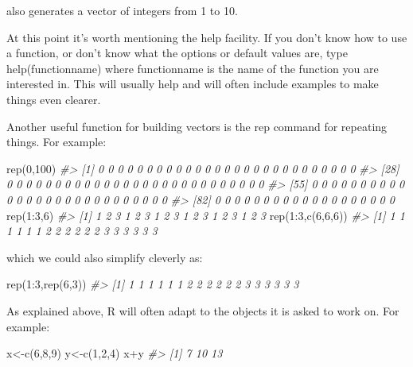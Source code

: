\documentclass[
]{book}
\newenvironment{Shaded}{\begin{snugshade}}{\end{snugshade}}
\newcommand{\CommentTok}[1]{\textcolor[rgb]{0.56,0.35,0.01}{\textit{#1}}}
\newcommand{\DecValTok}[1]{\textcolor[rgb]{0.00,0.00,0.81}{#1}}
\newcommand{\FunctionTok}[1]{\textcolor[rgb]{0.00,0.00,0.00}{#1}}
\newcommand{\NormalTok}[1]{#1}
\newcommand{\OtherTok}[1]{\textcolor[rgb]{0.56,0.35,0.01}{#1}}
\newcommand{\SpecialCharTok}[1]{\textcolor[rgb]{0.00,0.00,0.00}{#1}}
\begin{document}
also generates a vector of integers from 1 to 10.

At this point it's worth mentioning the help facility. If you don't know how to use a function,
or don't know what the options or default values are, type help(functionname) where functionname is the name of the function you are interested in. This will usually help and will often include examples to make things even clearer.

Another useful function for building vectors is the rep command for repeating things. For
example:

\begin{Shaded}
\begin{Highlighting}[]
\FunctionTok{rep}\NormalTok{(}\DecValTok{0}\NormalTok{,}\DecValTok{100}\NormalTok{)}
\CommentTok{\#\textgreater{}   [1] 0 0 0 0 0 0 0 0 0 0 0 0 0 0 0 0 0 0 0 0 0 0 0 0 0 0 0}
\CommentTok{\#\textgreater{}  [28] 0 0 0 0 0 0 0 0 0 0 0 0 0 0 0 0 0 0 0 0 0 0 0 0 0 0 0}
\CommentTok{\#\textgreater{}  [55] 0 0 0 0 0 0 0 0 0 0 0 0 0 0 0 0 0 0 0 0 0 0 0 0 0 0 0}
\CommentTok{\#\textgreater{}  [82] 0 0 0 0 0 0 0 0 0 0 0 0 0 0 0 0 0 0 0}
\FunctionTok{rep}\NormalTok{(}\DecValTok{1}\SpecialCharTok{:}\DecValTok{3}\NormalTok{,}\DecValTok{6}\NormalTok{)}
\CommentTok{\#\textgreater{}  [1] 1 2 3 1 2 3 1 2 3 1 2 3 1 2 3 1 2 3}
\FunctionTok{rep}\NormalTok{(}\DecValTok{1}\SpecialCharTok{:}\DecValTok{3}\NormalTok{,}\FunctionTok{c}\NormalTok{(}\DecValTok{6}\NormalTok{,}\DecValTok{6}\NormalTok{,}\DecValTok{6}\NormalTok{))}
\CommentTok{\#\textgreater{}  [1] 1 1 1 1 1 1 2 2 2 2 2 2 3 3 3 3 3 3}
\end{Highlighting}
\end{Shaded}

which we could also simplify cleverly as:

\begin{Shaded}
\begin{Highlighting}[]
\FunctionTok{rep}\NormalTok{(}\DecValTok{1}\SpecialCharTok{:}\DecValTok{3}\NormalTok{,}\FunctionTok{rep}\NormalTok{(}\DecValTok{6}\NormalTok{,}\DecValTok{3}\NormalTok{))}
\CommentTok{\#\textgreater{}  [1] 1 1 1 1 1 1 2 2 2 2 2 2 3 3 3 3 3 3}
\end{Highlighting}
\end{Shaded}

As explained above, R will often adapt to the objects it is asked to work on. For example:

\begin{Shaded}
\begin{Highlighting}[]
\NormalTok{x}\OtherTok{\textless{}{-}}\FunctionTok{c}\NormalTok{(}\DecValTok{6}\NormalTok{,}\DecValTok{8}\NormalTok{,}\DecValTok{9}\NormalTok{)}
\NormalTok{y}\OtherTok{\textless{}{-}}\FunctionTok{c}\NormalTok{(}\DecValTok{1}\NormalTok{,}\DecValTok{2}\NormalTok{,}\DecValTok{4}\NormalTok{)}
\NormalTok{x}\SpecialCharTok{+}\NormalTok{y}
\CommentTok{\#\textgreater{} [1]  7 10 13}
\end{Highlighting}
\end{Shaded}
\end{document}
